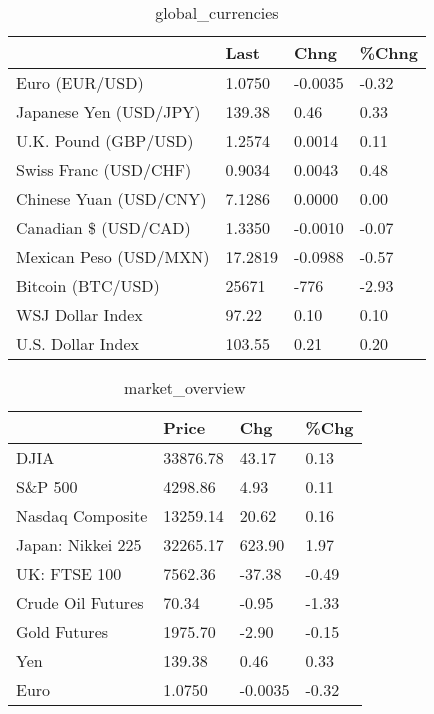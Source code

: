 \documentclass{article}%
\begin{document}
%


\begin{table}[htbp]%
\caption{global\_currencies}%
\centering%
\begin{adjustbox}{width=1\textwidth}%
\begin{tabular}{llll}
\toprule
                       &    Last &    Chng & \%Chng \\
\midrule
        Euro (EUR/USD) &  1.0750 & -0.0035 & -0.32 \\
Japanese Yen (USD/JPY) &  139.38 &    0.46 &  0.33 \\
  U.K. Pound (GBP/USD) &  1.2574 &  0.0014 &  0.11 \\
 Swiss Franc (USD/CHF) &  0.9034 &  0.0043 &  0.48 \\
Chinese Yuan (USD/CNY) &  7.1286 &  0.0000 &  0.00 \\
  Canadian \$ (USD/CAD) &  1.3350 & -0.0010 & -0.07 \\
Mexican Peso (USD/MXN) & 17.2819 & -0.0988 & -0.57 \\
     Bitcoin (BTC/USD) &   25671 &    -776 & -2.93 \\
      WSJ Dollar Index &   97.22 &    0.10 &  0.10 \\
     U.S. Dollar Index &  103.55 &    0.21 &  0.20 \\
\bottomrule
\end{tabular}
%
\end{adjustbox}%
\end{table}

%


\begin{table}[htbp]%
\caption{market\_overview}%
\centering%
\begin{adjustbox}{width=1\textwidth}%
\begin{tabular}{llll}
\toprule
                  &    Price &     Chg &  \%Chg \\
\midrule
             DJIA & 33876.78 &   43.17 &  0.13 \\
          S\&P 500 &  4298.86 &    4.93 &  0.11 \\
 Nasdaq Composite & 13259.14 &   20.62 &  0.16 \\
Japan: Nikkei 225 & 32265.17 &  623.90 &  1.97 \\
     UK: FTSE 100 &  7562.36 &  -37.38 & -0.49 \\
Crude Oil Futures &    70.34 &   -0.95 & -1.33 \\
     Gold Futures &  1975.70 &   -2.90 & -0.15 \\
              Yen &   139.38 &    0.46 &  0.33 \\
             Euro &   1.0750 & -0.0035 & -0.32 \\
\bottomrule
\end{tabular}
%
\end{adjustbox}%
\end{table}

%
\end{document}
